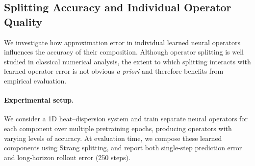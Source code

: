 \documentclass{article}
\theoremstyle{plain}
\theoremstyle{definition}
\theoremstyle{remark}
\begin{document}


\subsection{Splitting Accuracy and Individual Operator Quality}
\label{subsec:splitting-accuracy}

We investigate how approximation error in individual learned neural operators influences the accuracy of their composition. Although operator splitting is well studied in classical numerical analysis, the extent to which splitting interacts with learned operator error is not obvious \emph{a priori} and therefore benefits from empirical evaluation.



\paragraph{Experimental setup.}
We consider a 1D heat--dispersion system and train separate neural operators for each component over multiple pretraining epochs, producing operators with varying levels of accuracy. At evaluation time, we compose these learned components using Strang splitting, and report both single-step prediction error and long-horizon rollout error (250 steps).
\end{document}
